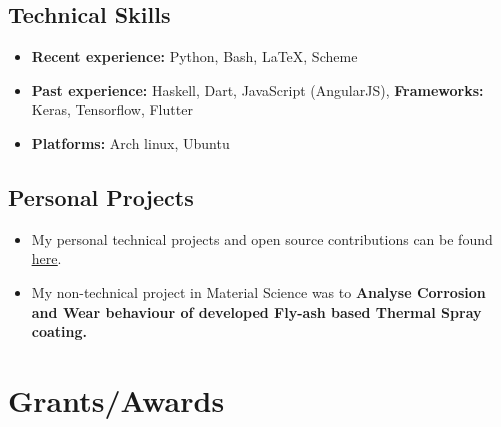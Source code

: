 \documentclass[11pt,a4paper,sans]{moderncv}
\begin{document}
\subsection{Technical Skills}

\begin{itemize}

\vspace{6pt}

\item \textbf{Recent experience:} Python, Bash, \LaTeX, Scheme  
\vspace{6pt}

\item \textbf{Past experience:} Haskell, Dart, JavaScript (AngularJS), \small{\textbf{Frameworks:}} Keras, Tensorflow, Flutter

\vspace{6pt}

\item \textbf{Platforms:} Arch linux, Ubuntu

\end{itemize}

\vspace{6pt}

\subsection{Personal Projects}

\vspace{6pt}

\begin{itemize}

\item My personal technical projects and open source contributions can be found \underline{\href{https://github.com/akki2825}{here}}.

\vspace{6pt}

\item My non-technical project in Material Science was to \textbf{Analyse Corrosion and Wear behaviour of developed Fly-ash based Thermal Spray coating.}

\end{itemize}

\vspace{6pt}

\section{Grants/Awards}
\end{document}
